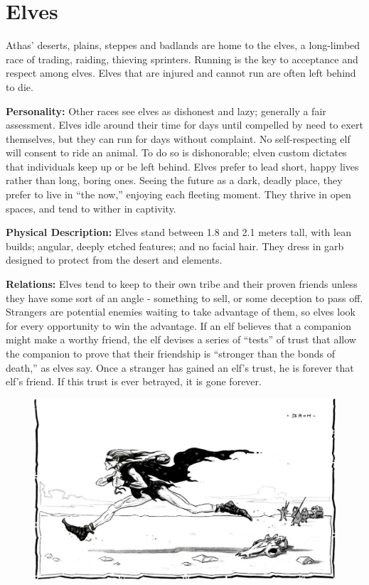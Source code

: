 \section{Elves}

Athas' deserts, plains, steppes and badlands are home to the elves, a long-limbed race of trading, raiding, thieving sprinters. Running is the key to acceptance and respect among elves. Elves that are injured and cannot run are often left behind to die.

\textbf{Personality:} Other races see elves as dishonest and lazy; generally a fair assessment. Elves idle around their time for days until compelled by need to exert themselves, but they can run for days without complaint. No self-respecting elf will consent to ride an animal. To do so is dishonorable; elven custom dictates that individuals keep up or be left behind. Elves prefer to lead short, happy lives rather than long, boring ones. Seeing the future as a dark, deadly place, they prefer to live in ``the now,'' enjoying each fleeting moment. They thrive in open spaces, and tend to wither in captivity.

\textbf{Physical Description:} Elves stand between 1.8 and 2.1 meters tall, with lean builds; angular, deeply etched features; and no facial hair. They dress in garb designed to protect from the desert and elements.

\textbf{Relations:} Elves tend to keep to their own tribe and their proven friends unless they have some sort of an angle - something to sell, or some deception to pass off. Strangers are potential enemies waiting to take advantage of them, so elves look for every opportunity to win the advantage. If an elf believes that a companion might make a worthy friend, the elf devises a series of ``tests'' of trust that allow the companion to prove that their friendship is ``stronger than the bonds of death,'' as elves say. Once a stranger has gained an elf's trust, he is forever that elf's friend. If this trust is ever betrayed, it is gone forever.

\begin{figure}[t]
\centering
\includegraphics[width=\textwidth]{images/elf-1.png}
\WOTC
\end{figure}


